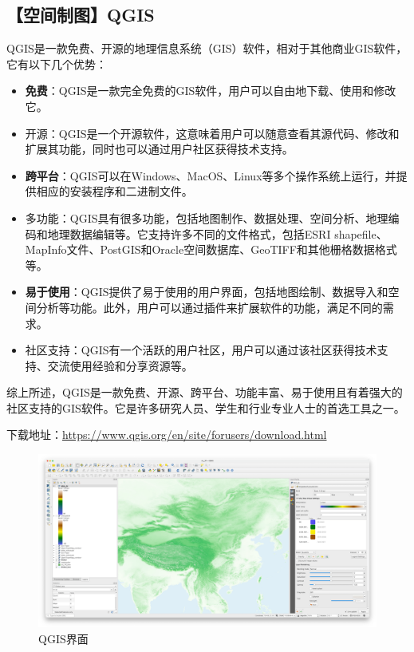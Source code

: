 \documentclass[
]{ctexbook}
\providecommand{\tightlist}{%
  \setlength{\itemsep}{0pt}\setlength{\parskip}{0pt}}
\begin{document}
\hypertarget{ux7a7aux95f4ux5236ux56feqgis}{%
\subsection{【空间制图】QGIS}\label{ux7a7aux95f4ux5236ux56feqgis}}

QGIS是一款免费、开源的地理信息系统（GIS）软件，相对于其他商业GIS软件，它有以下几个优势：

\begin{itemize}
\tightlist
\item
  \textbf{免费}：QGIS是一款完全免费的GIS软件，用户可以自由地下载、使用和修改它。
\item
  开源：QGIS是一个开源软件，这意味着用户可以随意查看其源代码、修改和扩展其功能，同时也可以通过用户社区获得技术支持。
\item
  \textbf{跨平台}：QGIS可以在Windows、MacOS、Linux等多个操作系统上运行，并提供相应的安装程序和二进制文件。
\item
  多功能：QGIS具有很多功能，包括地图制作、数据处理、空间分析、地理编码和地理数据编辑等。它支持许多不同的文件格式，包括ESRI shapefile、MapInfo文件、PostGIS和Oracle空间数据库、GeoTIFF和其他栅格数据格式等。
\item
  \textbf{易于使用}：QGIS提供了易于使用的用户界面，包括地图绘制、数据导入和空间分析等功能。此外，用户可以通过插件来扩展软件的功能，满足不同的需求。
\item
  社区支持：QGIS有一个活跃的用户社区，用户可以通过该社区获得技术支持、交流使用经验和分享资源等。
\end{itemize}

综上所述，QGIS是一款免费、开源、跨平台、功能丰富、易于使用且有着强大的社区支持的GIS软件。它是许多研究人员、学生和行业专业人士的首选工具之一。

下载地址：\url{https://www.qgis.org/en/site/forusers/download.html}

\begin{figure}
\centering
\includegraphics{Fig/skill/qgis.png}
\caption{QGIS界面}
\end{figure}
\end{document}
